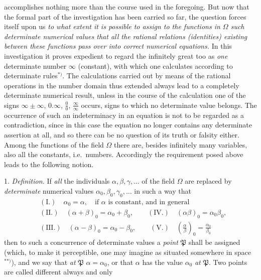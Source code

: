 \documentclass{article}
\begin{document}
accomplishes nothing more than the course used in the foregoing. But now that the formal part of the investigation has been carried so far, the question forces itself upon us \emph{to what extent it is possible to assign to the functions in $\Omega$ such determinate numerical values that all the rational relations (identities) existing between these functions pass over into correct numerical equations.} In this investigation it proves expedient to regard the infinitely great too as \emph{one} determinate number $\infty$ (constant), with which one calculates according to determinate rules${}^{*)}$. The calculations carried out by means of the rational operations in the number domain thus extended always lead to a completely determinate numerical result, unless in the course of the calculation one of the signs $\infty \pm \infty$, $0.\infty$, $\frac{0}{0}$, $\frac{\infty}{\infty}$ occurs, signs to which no determinate value belongs. The occurrence of such an indeterminacy in an equation is not to be regarded as a contradiction, since in this case the equation no longer contains any determinate assertion at all, and so there can be no question of its truth or falsity either. Among the functions of the field $\Omega$ there are, besides infinitely many variables, also all the constants, i.e.\ numbers. Accordingly the requirement posed above leads to the following notion.

1. \emph{Definition.} If \emph{all} the individuals $\alpha, \beta, \gamma, \ldots$ of the field $\Omega$ are replaced by \emph{determinate} numerical values $\alpha_{0}, \beta_{0}, \gamma_{0}, \ldots$ in such a way that
\[ \begin{aligned} &(\text{I.}) \quad \alpha_{0} = \alpha, \quad \text{if } \alpha \text{ is constant, and in general} \\ &(\text{II.}) \quad (\alpha + \beta)_{0} = \alpha_{0} + \beta_{0}, \qquad (\text{IV.}) \quad (\alpha\beta)_{0} = \alpha_{0}\beta_{0}, \\ &(\text{III.}) \quad (\alpha - \beta)_{0} = \alpha_{0} - \beta_{0}, \qquad (\text{V.}) \quad \left(\frac{\alpha}{\beta}\right)_{0} = \frac{\alpha_{0}}{\beta_{0}} \end{aligned} \]
then to such a concurrence of determinate values a \emph{point} $\mathfrak{P}$ shall be assigned (which, to make it perceptible, one may imagine as situated somewhere in space${}^{**)}$), and we say that \emph{at} $\mathfrak{P}$ $\alpha = \alpha_{0}$, or that $\alpha$ has the value $\alpha_{0}$ \emph{at} $\mathfrak{P}$. Two points are called different always and only
\end{document}
